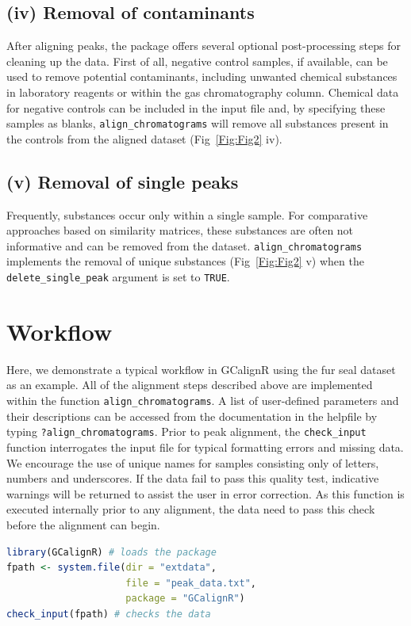 \documentclass[10pt,letterpaper]{article}
\begin{document}
\subsection*{(iv) Removal of contaminants}
After aligning peaks, the package offers several optional post-processing steps for cleaning up the data. First of all, negative control samples, if available, can be used to remove potential contaminants, including unwanted chemical substances in laboratory reagents or within the gas chromatography column. Chemical data for negative controls can be included in the input file and, by specifying these samples as blanks, \texttt{align\_chromatograms} will remove all substances present in the controls from the aligned dataset (Fig~\ref{Fig:Fig2} iv).

\subsection*{(v) Removal of single peaks}
Frequently, substances occur only within a single sample. For comparative approaches based on similarity matrices, these substances are often not informative and can be removed from the dataset. \texttt{align\_chromatograms} implements the removal of unique substances (Fig~\ref{Fig:Fig2} v) when the \texttt{delete\_single\_peak} argument is set to \texttt{TRUE}.

\section*{Workflow}
Here, we demonstrate a typical workflow in GCalignR using the fur seal dataset as an example. All of the alignment steps described above are implemented within the function \texttt{align\_chromatograms}. A list of user-defined parameters and their descriptions can be accessed from the documentation in the helpfile by typing \texttt{?align\_chromatograms}. Prior to peak alignment, the \texttt{check\_input} function interrogates the input file for typical formatting errors and missing data. We encourage the use of unique names for samples consisting only of letters, numbers and underscores. If the data fail to pass this quality test, indicative warnings will be returned to assist the user in error correction. As this function is executed internally prior to any alignment, the data need to pass this check before the alignment can begin.


\begin{lstlisting}[language=R]
library(GCalignR) # loads the package 
fpath <- system.file(dir = "extdata",
                     file = "peak_data.txt",
                     package = "GCalignR")
check_input(fpath) # checks the data
\end{lstlisting}
\end{document}
